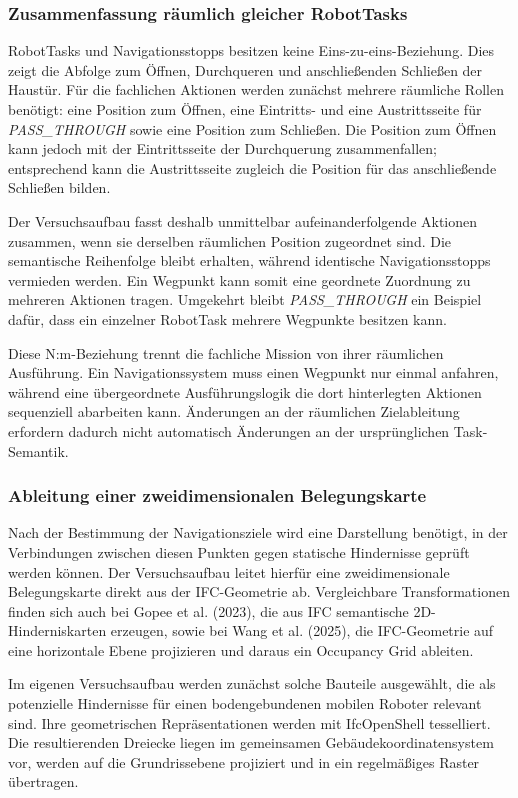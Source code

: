 \subsubsection{Zusammenfassung räumlich gleicher RobotTasks}
RobotTasks und Navigationsstopps besitzen keine Eins-zu-eins-Beziehung. Dies zeigt die Abfolge zum
Öffnen, Durchqueren und anschließenden Schließen der Haustür. Für die fachlichen Aktionen werden
zunächst mehrere räumliche Rollen benötigt: eine Position zum Öffnen, eine Eintritts- und eine
Austrittsseite für \textit{PASS\_THROUGH} sowie eine Position zum Schließen. Die Position zum Öffnen
kann jedoch mit der Eintrittsseite der Durchquerung zusammenfallen; entsprechend kann die
Austrittsseite zugleich die Position für das anschließende Schließen bilden.

Der Versuchsaufbau fasst deshalb unmittelbar aufeinanderfolgende Aktionen zusammen, wenn sie
derselben räumlichen Position zugeordnet sind. Die semantische Reihenfolge bleibt erhalten, während
identische Navigationsstopps vermieden werden. Ein Wegpunkt kann somit eine geordnete Zuordnung zu
mehreren Aktionen tragen. Umgekehrt bleibt \textit{PASS\_THROUGH} ein Beispiel dafür, dass ein
einzelner RobotTask mehrere Wegpunkte besitzen kann.

Diese N:m-Beziehung trennt die fachliche Mission von ihrer räumlichen Ausführung. Ein
Navigationssystem muss einen Wegpunkt nur einmal anfahren, während eine übergeordnete
Ausführungslogik die dort hinterlegten Aktionen sequenziell abarbeiten kann. Änderungen an der
räumlichen Zielableitung erfordern dadurch nicht automatisch Änderungen an der ursprünglichen
Task-Semantik.

\subsubsection{Ableitung einer zweidimensionalen Belegungskarte}
Nach der Bestimmung der Navigationsziele wird eine Darstellung benötigt, in der Verbindungen
zwischen diesen Punkten gegen statische Hindernisse geprüft werden können. Der Versuchsaufbau leitet
hierfür eine zweidimensionale Belegungskarte direkt aus der IFC-Geometrie ab. Vergleichbare
Transformationen finden sich auch bei Gopee et al. (2023), die aus IFC semantische
2D-Hinderniskarten erzeugen, sowie bei Wang et al. (2025), die IFC-Geometrie auf eine horizontale
Ebene projizieren und daraus ein Occupancy Grid ableiten.

Im eigenen Versuchsaufbau werden zunächst solche Bauteile ausgewählt, die als potenzielle
Hindernisse für einen bodengebundenen mobilen Roboter relevant sind. Ihre geometrischen
Repräsentationen werden mit IfcOpenShell tesselliert. Die resultierenden Dreiecke liegen im
gemeinsamen Gebäudekoordinatensystem vor, werden auf die Grundrissebene projiziert und in ein
regelmäßiges Raster übertragen.

